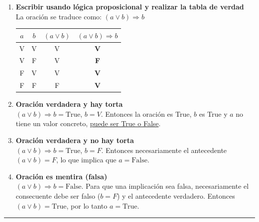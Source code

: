 \begin{enumerate}[label=\textbf{\arabic*)}]
    \item \textbf{Escribir usando lógica proposicional y realizar la tabla de verdad} \\
    La oración se traduce como: $(a \vee b) \Rightarrow b$

    \begin{center}
    \begin{tabular}{|c|c|c|c|}
    \hline
    $a$ & $b$ & $(a \vee b)$ & $(a \vee b) \Rightarrow b$ \\
    \hline
    V & V & V & \textbf{V} \\
    V & F & V & \textbf{F} \\
    F & V & V & \textbf{V} \\
    F & F & F & \textbf{V} \\
    \hline
    \end{tabular}
    \end{center}

    \item \textbf{Oración verdadera y hay torta} \\
    $(a \vee b) \Rightarrow b = \text{True}$, $b = V$. Entonces la oración es True, $b$ es True y $a$ no tiene un valor concreto, \underline{puede ser True o False}.

    \item \textbf{Oración verdadera y no hay torta} \\
    $(a \vee b) \Rightarrow b = \text{True}$, $b = F$. Entonces necesariamente el antecedente $(a \vee b) = F$, lo que implica que \underline{$a = \text{False}$}.

    \item \textbf{Oración es mentira (falsa)} \\
    $(a \vee b) \Rightarrow b = \text{False}$. Para que una implicación sea falsa, necesariamente el consecuente debe ser falso ($b = F$) y el antecedente verdadero. Entonces $(a \vee b) = \text{True}$, por lo tanto \underline{$a = \text{True}$}.
\end{enumerate}

\vspace{0.5cm}
\hrule
\vspace{0.5cm}
